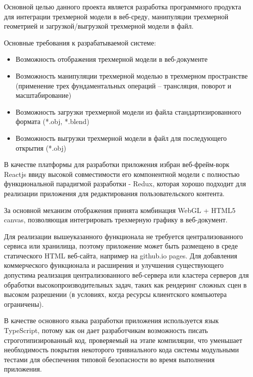 Основной целью данного проекта является разработка программного продукта для интеграции трехмерной модели в веб-среду,
манипуляции трехмерной геометрией и загрузкой/выгрузкой трехмерной модели в файл.

Основные требования к разрабатываемой системе:
\begin{itemize}
\item Возможность отображения трехмерной модели в веб-документе
\item Возможность манипуляции трехмерной моделью в трехмерном пространстве (применение трех фундаментальных операций -- трансляция, поворот и масштабирование) 
\item Возможность загрузки трехмерной модели из файла стандартизированного формата (*.obj, *.blend)
\item Возможность выгрузки трехмерной модели в файл для последующего открытия (*.obj)
\end{itemize}

В качестве платформы для разработки
приложения избран веб-фрейм-ворк Reactjs\cite{react3} ввиду высокой совместимости его компонентной модели с полностью функциональной
парадигмой разработки - Redux, которая хорошо подходит для реализации приложения для редактирования пользовательского
контента.

За основной механизм отображения принята комбинация WebGL + HTML5 canvas, позволяющая интегрировать трехмерную графику в
веб-документ.

Для реализации вышеуказанного функционала не требуется централизованного сервиса или хранилища, поэтому приложение может быть
размещено в среде статического HTML веб-сайта, например на github.io pages. Для добавления коммерческого функционала и расширения и
улучшения существующего допустима реализация централизованного веб-сервера или кластера серверов для обработки высокопроизводительных
задач, таких как рендеринг сложных сцен в высоком разрешении (в условиях, когда ресурсы клиентского компьютера ограничены).

В качестве основного языка разработки приложения используется язык TypeScript, потому как он дает разработчикам возможность писать строготипизированный код,
проверяемый на этапе компиляции, что уменьшает необходимость покрытия некоторого тривиального кода системы модульными тестами для обеспечения типовой безопасности
во время выполнения приложения.